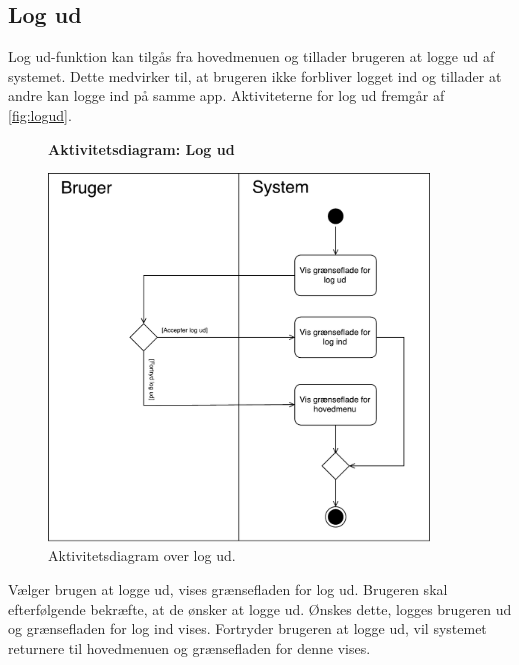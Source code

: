 \subsection*{Log ud}
Log ud-funktion kan tilgås fra hovedmenuen og tillader brugeren at logge ud af systemet. Dette medvirker til, at brugeren ikke forbliver logget ind og tillader at andre  kan logge ind på samme app.
Aktiviteterne for log ud fremgår af \autoref{fig:logud}.

\begin{figure} [H]
\centering
\textbf{Aktivitetsdiagram: Log ud}\par\medskip
\includegraphics[width=0.9\textwidth]{figures/aktivitetsdiagram/Logud}
\caption{Aktivitetsdiagram over log ud.}
\label{fig:logud}
\end{figure}

\noindent
Vælger brugen at logge ud, vises grænsefladen for log ud. Brugeren skal efterfølgende bekræfte, at de ønsker at logge ud. Ønskes dette, logges brugeren ud og grænsefladen for log ind vises. Fortryder brugeren at logge ud, vil systemet returnere til hovedmenuen og grænsefladen for denne vises. 